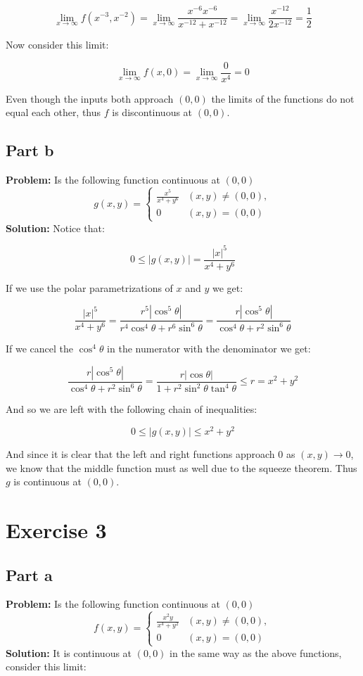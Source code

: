 \documentclass{article}
\begin{document}
$$\lim_{x\to\infty}f(x^{-3},x^{-2})=\lim_{x\to\infty}\frac{x^{-6}x^{-6}}{x^{-12}+x^{-12}}=\lim_{x\to\infty}\frac{x^{-12}}{2x^{-12}}=\frac{1}{2}$$

Now consider this limit:

$$\lim_{x\to\infty}f(x,0)=\lim_{x\to\infty}\frac{0}{x^4}=0$$

Even though the inputs both approach $(0,0)$ the limits of the functions do not equal each other, thus $f$ is discontinuous at $(0,0)$.

\subsection*{Part b}
\textbf{Problem:} Is the following function continuous at $(0,0)$
$$g(x,y)=\begin{cases}
          \frac{x^5}{x^4+y^6} & (x,y)\not=(0,0), \\
          0 & (x,y)=(0,0)
          \end{cases}$$
\textbf{Solution:} Notice that:

$$0\le\left|g(x,y)\right|=\frac{|x|^5}{x^4+y^6}$$

If we use the polar parametrizations of $x$ and $y$ we get:

$$\frac{|x|^5}{x^4+y^6}=\frac{r^5|\cos^5\theta|}{r^4\cos^4\theta+r^6\sin^6\theta}=\frac{r|\cos^5\theta|}{\cos^4\theta+r^2\sin^6\theta}$$

If we cancel the $\cos^4\theta$ in the numerator with the denominator we get:

$$\frac{r|\cos^5\theta|}{\cos^4\theta+r^2\sin^6\theta}=\frac{r|\cos\theta|}{1+r^2\sin^2\theta\tan^4\theta}\le r=x^2+y^2$$

And so we are left with the following chain of inequalities:

$$0\le\left|g(x,y)\right|\le x^2+y^2$$

And since it is clear that the left and right functions approach 0 as $(x,y)\to0$, we know that the middle function must as well due to the squeeze theorem. Thus $g$ is continuous at $(0,0)$.

\section*{Exercise 3}
\subsection*{Part a}
\textbf{Problem:} Is the following function continuous at $(0,0)$
$$f(x,y)=\begin{cases}
          \frac{x^2y}{x^4+y^2} & (x,y)\not=(0,0), \\
          0 & (x,y)=(0,0)
          \end{cases}$$
\textbf{Solution:} It is continuous at $(0,0)$ in the same way as the above functions, consider this limit:
\end{document}
